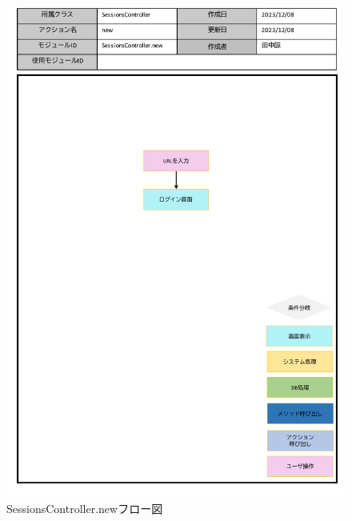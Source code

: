 \begin{figure}
    \centering
    \includegraphics[scale=0.6]{img/Sessions/pptx/SessionsController_new.pdf}
    \caption{SessionsController.newフロー図}
\end{figure}
\clearpage
